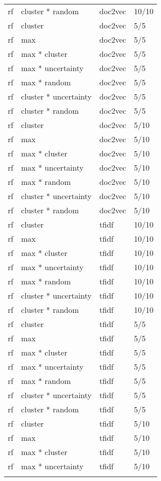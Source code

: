 \documentclass[12pt,twoside]{reedthesis}
\begin{document}
\begin{longtable}{llll}
rf & cluster * random & doc2vec & 10/10\\
rf & cluster & doc2vec & 5/5\\
rf & max & doc2vec & 5/5\\
\addlinespace
rf & max * cluster & doc2vec & 5/5\\
rf & max * uncertainty & doc2vec & 5/5\\
rf & max * random & doc2vec & 5/5\\
rf & cluster * uncertainty & doc2vec & 5/5\\
rf & cluster * random & doc2vec & 5/5\\
\addlinespace
rf & cluster & doc2vec & 5/10\\
rf & max & doc2vec & 5/10\\
rf & max * cluster & doc2vec & 5/10\\
rf & max * uncertainty & doc2vec & 5/10\\
rf & max * random & doc2vec & 5/10\\
\addlinespace
rf & cluster * uncertainty & doc2vec & 5/10\\
rf & cluster * random & doc2vec & 5/10\\
rf & cluster & tfidf & 10/10\\
rf & max & tfidf & 10/10\\
rf & max * cluster & tfidf & 10/10\\
\addlinespace
rf & max * uncertainty & tfidf & 10/10\\
rf & max * random & tfidf & 10/10\\
rf & cluster * uncertainty & tfidf & 10/10\\
rf & cluster * random & tfidf & 10/10\\
rf & cluster & tfidf & 5/5\\
\addlinespace
rf & max & tfidf & 5/5\\
rf & max * cluster & tfidf & 5/5\\
rf & max * uncertainty & tfidf & 5/5\\
rf & max * random & tfidf & 5/5\\
rf & cluster * uncertainty & tfidf & 5/5\\
\addlinespace
rf & cluster * random & tfidf & 5/5\\
rf & cluster & tfidf & 5/10\\
rf & max & tfidf & 5/10\\
rf & max * cluster & tfidf & 5/10\\
rf & max * uncertainty & tfidf & 5/10\\
\addlinespace

\end{longtable}
\end{document}
